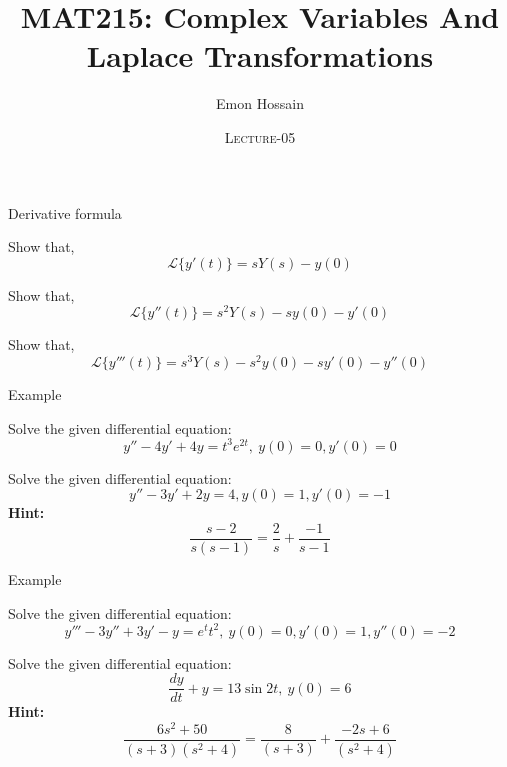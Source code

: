 \documentclass[11pt]{beamer}
\author[] %
{Emon Hossain\inst{1}}
\institute[University of Dhaka] %
{
  \inst{1}%
  Lecturer\\MNS department\\Brac University
}
\date[] %
{\textsc{Lecture-05}}
\title[]{MAT215: Complex Variables And Laplace Transformations}
\theoremstyle{plain}
\begin{document}
\begin{frame}
\titlepage
\end{frame}

\begin{frame}{Derivative formula}
    \begin{example}
        Show that, $$\mathcal{L}\{y'(t)\}=sY(s)-y(0)$$
    \end{example}
    \begin{example}
        Show that, $$\mathcal{L}\{y''(t)\}=s^2Y(s)-sy(0)-y'(0)$$
    \end{example}
    \begin{example}
        Show that, $$\mathcal{L}\{y'''(t)\}=s^3Y(s)-s^2y(0)-sy'(0)-y''(0)$$
    \end{example}
\end{frame}

\begin{frame}{Example}
    \begin{example}
        Solve the given differential equation:
        $$y''-4y'+4y=t^3e^{2t},\:y(0)=0,y'(0)=0$$
    \end{example}
    \begin{example}
        Solve the given differential equation:
        $$y''-3y'+2y=4,y(0)=1,y'(0)=-1$$
        \textbf{Hint:}
        $$\frac{s-2}{s(s-1)}=\frac{2}{s}+\frac{-1}{s-1}$$
    \end{example}
\end{frame}
\begin{frame}{Example}
    \begin{example}
        Solve the given differential equation:
        $$y'''-3y''+3y'-y=e^t t^2,\:y(0)=0,y'(0)=1,y''(0)=-2$$
    \end{example}
    \begin{example}
        Solve the given differential equation:
        $$\frac{dy}{dt}+y=13\sin 2t,\:y(0)=6$$
        \textbf{Hint:}
        $$\frac{6s^2+50}{(s+3)(s^2+4)}=\frac{8}{(s+3)}+\frac{-2s+6}{(s^2+4)}$$
    \end{example}
\end{frame}
\end{document}
